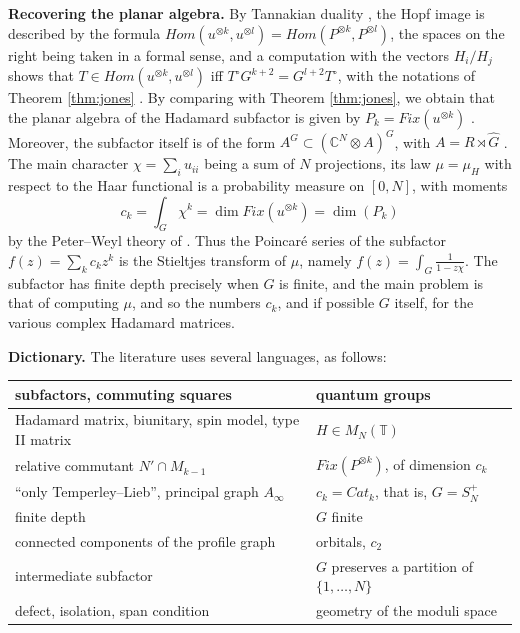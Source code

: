 \documentclass[11pt]{amsart}
\newcommand{\T}{\mathbb T}
\begin{document}
\noindent\textbf{Recovering the planar algebra.} By Tannakian duality \cite{wo2}, the Hopf image is described by the formula $Hom(u^{\otimes k},u^{\otimes l})=Hom(P^{\otimes k},P^{\otimes l})$, the spaces on the right being taken in a formal sense, and a computation with the vectors $H_i/H_j$ shows that $T\in Hom(u^{\otimes k},u^{\otimes l})$ iff $T^\circ G^{k+2}=G^{l+2}T^\circ$, with the notations of Theorem \ref{thm:jones} \cite[Theorem 14.9]{banicaHM}. By comparing with Theorem \ref{thm:jones}, we obtain that the planar algebra of the Hadamard subfactor is given by $P_k=Fix(u^{\otimes k})$ \cite{bbs}. Moreover, the subfactor itself is of the form $A^G\subset(\mathbb C^N\otimes A)^G$, with $A=R\rtimes\widehat{G}$ \cite{ba0}. The main character $\chi=\sum_iu_{ii}$ being a sum of $N$ projections, its law $\mu=\mu_H$ with respect to the Haar functional is a probability measure on $[0,N]$, with moments
$$c_k=\int_G\chi^k=\dim Fix(u^{\otimes k})=\dim(P_k)$$
by the Peter--Weyl theory of \cite{wo1}. Thus the Poincar\'e series of the subfactor $f(z)=\sum_kc_kz^k$ is the Stieltjes transform of $\mu$, namely $f(z)=\int_G\frac{1}{1-z\chi}$. The subfactor has finite depth precisely when $G$ is finite, and the main problem is that of computing $\mu$, and so the numbers $c_k$, and if possible $G$ itself, for the various complex Hadamard matrices.

\medskip

\noindent\textbf{Dictionary.} The literature uses several languages, as follows:

\medskip

\begin{center}
\begin{tabular}{ll}
\toprule
subfactors, commuting squares & quantum groups\\
\midrule
Hadamard matrix, biunitary, spin model, type II matrix & $H\in M_N(\T)$\\
relative commutant $N'\cap M_{k-1}$ & $Fix(P^{\otimes k})$, of dimension $c_k$\\
``only Temperley--Lieb'', principal graph $A_\infty$ & $c_k=Cat_k$, that is, $G=S_N^+$\\
finite depth & $G$ finite\\
connected components of the profile graph & orbitals, $c_2$\\
intermediate subfactor & $G$ preserves a partition of $\{1,\ldots,N\}$\\
defect, isolation, span condition & geometry of the moduli space\\
\bottomrule
\end{tabular}
\end{center}
\end{document}
